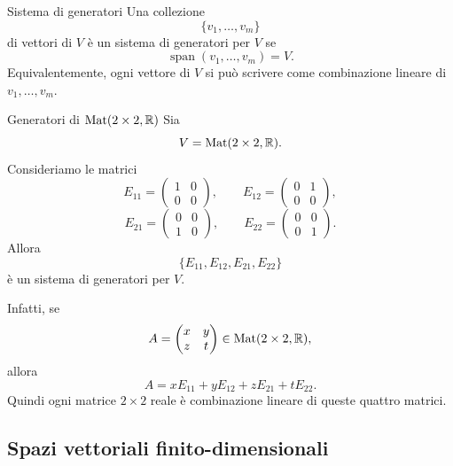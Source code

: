 \documentclass[a4paper]{article}
\begin{document}
\begin{snippetdefinition}{Sistema di generatori}
    Una collezione
    \[
        \{v_1,\ldots,v_m\}
    \]
    di vettori di \(V\) è un sistema di generatori per \(V\) se
    \[
        \operatorname{span}(v_1,\ldots,v_m)=V.
    \]
    Equivalentemente, ogni vettore di \(V\) si può scrivere come combinazione lineare di \(v_1,\ldots,v_m\).
\end{snippetdefinition}

\begin{snippetexample}{Generatori di \(\operatorname{Mat}(2\times 2,\mathbb{R})\)}
    Sia
    \[
        V=\operatorname{Mat}(2\times 2,\mathbb{R}).
    \]
    Consideriamo le matrici
    \[
        E_{11}=
        \begin{pmatrix}
            1 & 0\\
            0 & 0
        \end{pmatrix},
        \qquad
        E_{12}=
        \begin{pmatrix}
            0 & 1\\
            0 & 0
        \end{pmatrix},
    \]
    \[
        E_{21}=
        \begin{pmatrix}
            0 & 0\\
            1 & 0
        \end{pmatrix},
        \qquad
        E_{22}=
        \begin{pmatrix}
            0 & 0\\
            0 & 1
        \end{pmatrix}.
    \]
    Allora
    \[
        \{E_{11},E_{12},E_{21},E_{22}\}
    \]
    è un sistema di generatori per \(V\).

    Infatti, se
    \[
        A=
        \begin{pmatrix}
            x & y\\
            z & t
        \end{pmatrix}
        \in \operatorname{Mat}(2\times 2,\mathbb{R}),
    \]
    allora
    \[
        A
        =
        xE_{11}+yE_{12}+zE_{21}+tE_{22}.
    \]
    Quindi ogni matrice \(2\times 2\) reale è combinazione lineare di queste quattro matrici.
\end{snippetexample}

\subsection{Spazi vettoriali finito-dimensionali}
\end{document}
